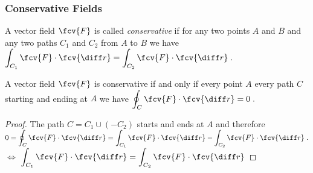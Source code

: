 \begin{frame}
\frametitle{Conservative Fields}
\begin{definition}
A vector field $\fcv{F}$ is called \emph{conservative} if for any two points $A$ and $B$ and any two paths $C_1$ and $C_2$ from $A$ to $B$ we have
$\displaystyle \int_{C_1} \fcv{F} \cdot \fcv{\diff r} = \int_{C_2} \fcv{F}\cdot \fcv{\diff r}\; .$
\end{definition}
\begin{lemma}
A vector field $\fcv{F}$ is conservative if and only if every point $A$ every path $C$ starting and ending at $A$ we have $\displaystyle\oint_{C} \fcv{F} \cdot \fcv{\diff r} = 0\; .$
\end{lemma}
\begin{proof}
The path $C = C_1 \cup (-C_2)$ starts and ends at $A$ and therefore 
$\displaystyle 0= \oint_{C} \fcv{F} \cdot \fcv{\diff r} = \int_{C_1} \fcv{F} \cdot \fcv{\diff r} - \int_{C_2} \fcv{F} \cdot \fcv{\diff r}\; .$ $\Leftrightarrow$ $\displaystyle  \int_{C_1} \fcv{F} \cdot \fcv{\diff r} = \int_{C_2} \fcv{F} \cdot \fcv{\diff r}$
\end{proof}
\end{frame}
